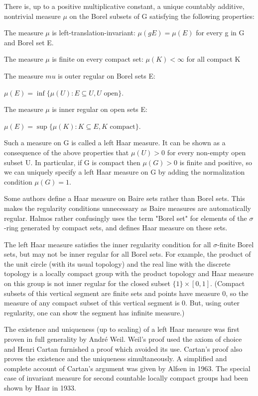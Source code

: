 \documentclass[oneside,12pt]{memoir}
\begin{document}
There is, up to a positive multiplicative constant, a unique countably additive, nontrivial measure $\mu$ on the Borel subsets of G satisfying the following properties:
\begin{itemize*}
\item The measure $\mu$ is left-translation-invariant: $\mu(gE)=\mu(E)$ for every g in G and Borel set E.

\item The measure $\mu$ is finite on every compact set: $\mu(K)<\infty$ for all compact K

\item The measure $mu$ is outer regular on Borel sets E:

        $\mu(E) = \inf \{\mu(U): E \subseteq U, U \text{ open}\}$.

\item The measure $\mu$ is inner regular on open sets E:

        $\mu(E) = \sup \{\mu(K): K \subseteq E, K \text{ compact}\}$.
 
\end{itemize*}
    
Such a measure on G is called a left Haar measure. It can be shown as a consequence of the above properties that $\mu(U)>0$ for every non-empty open subset U. In particular, if G is compact then $\mu(G)>0$ is finite and positive, so we can uniquely specify a left Haar measure on G by adding the normalization condition $\mu(G)=1$.

Some authors define a Haar measure on Baire sets rather than Borel sets. This makes the regularity conditions unnecessary as Baire measures are automatically regular. Halmos rather confusingly uses the term "Borel set" for elements of the $\sigma$-ring generated by compact sets, and defines Haar measure on these sets.

The left Haar measure satisfies the inner regularity condition for all $\sigma$-finite Borel sets, but may not be inner regular for all Borel sets. For example, the product of the unit circle (with its usual topology) and the real line with the discrete topology is a locally compact group with the product topology and Haar measure on this group is not inner regular for the closed subset $\{1\} \times [0,1]$. (Compact subsets of this vertical segment are finite sets and points have measure 0, so the measure of any compact subset of this vertical segment is 0. But, using outer regularity, one can show the segment has infinite measure.)

The existence and uniqueness (up to scaling) of a left Haar measure was first proven in full generality by Andr\'e Weil. Weil's proof used the axiom of choice and Henri Cartan furnished a proof which avoided its use. Cartan's proof also proves the existence and the uniqueness simultaneously. A simplified and complete account of Cartan's argument was given by Alfsen in 1963. The special case of invariant measure for second countable locally compact groups had been shown by Haar in 1933.
\end{document}
